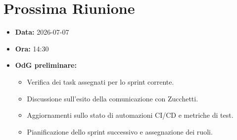 \section{Prossima Riunione}
\begin{itemize}
	\item \textbf{Data:} 2026-07-07
	\item \textbf{Ora:} 14:30
	\item \textbf{OdG preliminare:}
	\begin{itemize}
		\item Verifica dei task assegnati per lo sprint corrente.
		\item Discussione sull'esito della comunicazione con Zucchetti.
		\item Aggiornamenti sullo stato di automazioni CI/CD e metriche di test.
		\item Pianificazione dello sprint successivo e assegnazione dei ruoli.
	\end{itemize}
\end{itemize}

